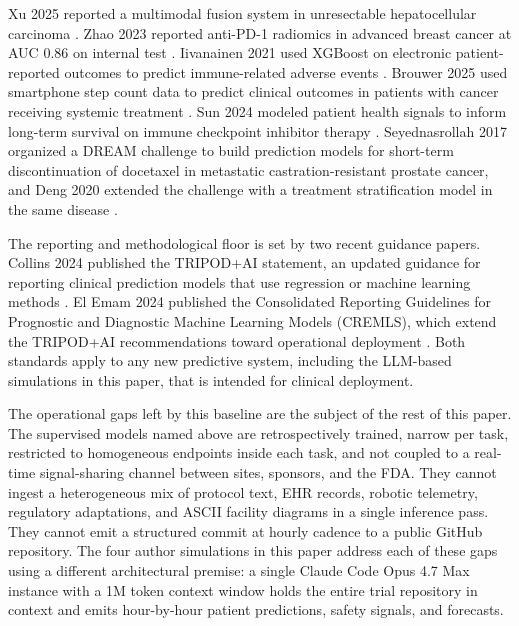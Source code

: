 \documentclass[11pt]{article}
\begin{document}
\clearpage


Xu 2025 reported a multimodal
fusion system in unresectable hepatocellular carcinoma
\cite{Xu2025MMF}. Zhao 2023 reported anti-PD-1 radiomics in advanced
breast cancer at AUC 0.86 on internal test \cite{Zhao2023BreastRadiomics}.
Iivanainen 2021 used XGBoost on electronic patient-reported outcomes
to predict immune-related adverse events
\cite{Iivanainen2021irAE}. Brouwer 2025 used smartphone step count
data to predict clinical outcomes in patients with cancer receiving
systemic treatment \cite{Brouwer2025StepCount}. Sun 2024 modeled
patient health signals to inform long-term survival on immune
checkpoint inhibitor therapy \cite{Sun2024HealthSignals}.
Seyednasrollah 2017 organized a DREAM challenge to build prediction
models for short-term discontinuation of docetaxel in metastatic
castration-resistant prostate cancer, and Deng 2020 extended the
challenge with a treatment stratification model in the same disease
\cite{Seyednasrollah2017Docetaxel, Deng2020mCRPC}.

The reporting and methodological floor is set by two recent guidance
papers. Collins 2024 published the TRIPOD+AI statement, an updated
guidance for reporting clinical prediction models that use regression
or machine learning methods \cite{Collins2024TRIPODAI}. El Emam 2024
published the Consolidated Reporting Guidelines for Prognostic and
Diagnostic Machine Learning Models (CREMLS), which extend the TRIPOD+AI
recommendations toward operational deployment \cite{ElEmam2024CREMLS}.
Both standards apply to any new predictive system, including the
LLM-based simulations in this paper, that is intended for clinical
deployment.

The operational gaps left by this baseline are the subject of the rest
of this paper. The supervised models named above are retrospectively
trained, narrow per task, restricted to homogeneous endpoints inside
each task, and not coupled to a real-time signal-sharing channel
between sites, sponsors, and the FDA. They cannot ingest a heterogeneous
mix of protocol text, EHR records, robotic telemetry, regulatory
adaptations, and ASCII facility diagrams in a single inference pass.
They cannot emit a structured commit at hourly cadence to a public
GitHub repository. The four author simulations in this paper address
each of these gaps using a different architectural premise: a single
Claude Code Opus 4.7 Max instance with a 1M token context window holds
the entire trial repository in context and emits hour-by-hour patient
predictions, safety signals, and forecasts.
\end{document}
